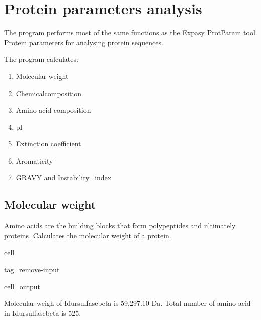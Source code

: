 \documentclass[letterpaper,10pt,english]{jupyterBook}
\begin{document}
\sphinxstepscope


\chapter{Protein parameters analysis}
\label{\detokenize{ipynb/chapter1:protein-parameters-analysis}}\label{\detokenize{ipynb/chapter1::doc}}
\sphinxAtStartPar
The program performs most of the same functions as the Expasy ProtParam tool.
Protein parameters for analysing protein sequences.

\sphinxAtStartPar
The program calculates:
\begin{enumerate}
%
\item {} 
\sphinxAtStartPar
Molecular weight

\item {} 
\sphinxAtStartPar
Chemicalcomposition

\item {} 
\sphinxAtStartPar
Amino acid composition

\item {} 
\sphinxAtStartPar
pI

\item {} 
\sphinxAtStartPar
Extinction coefficient

\item {} 
\sphinxAtStartPar
Aromaticity

\item {} 
\sphinxAtStartPar
GRAVY and Instability\_index

\end{enumerate}


\section{Molecular weight}
\label{\detokenize{ipynb/chapter1:molecular-weight}}
\sphinxAtStartPar
Amino acids are the building blocks that form polypeptides and ultimately proteins. Calculates the molecular weight of a protein.

\begin{sphinxuseclass}{cell}
\begin{sphinxuseclass}{tag_remove-input}\begin{sphinxVerbatimOutput}

\begin{sphinxuseclass}{cell_output}
\begin{sphinxVerbatim}[commandchars=\\\{\}]
Molecular weigh of Idursulfasebeta is 59,297.10 Da.
Total number of amino acid in Idursulfasebeta is 525.
\end{sphinxVerbatim}

\end{sphinxuseclass}\end{sphinxVerbatimOutput}

\end{sphinxuseclass}
\end{sphinxuseclass}
\end{document}
